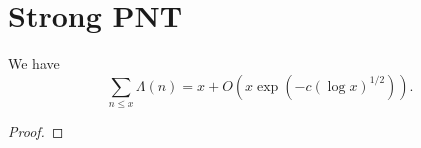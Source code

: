 \chapter{Strong PNT}\label{strong_pnt}

\begin{theorem}\label{Strong_PNT}  \leanok
We have
$$ \sum_{n \leq x} \Lambda(n) = x + O(x \exp(-c(\log x)^{1/2})).$$
\end{theorem}
\begin{proof}
\leanok
\end{proof}
